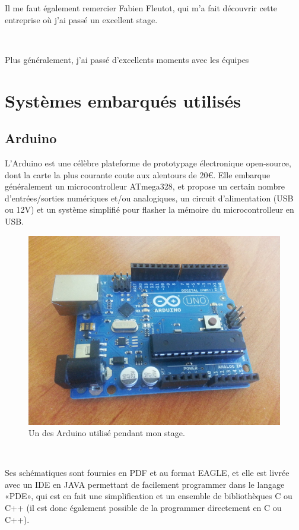\documentclass{article}
\begin{document}
Il me faut également remercier Fabien Fleutot, qui m’a fait découvrir cette entreprise où j’ai passé un excellent stage.

~

Plus généralement, j’ai passé d’excellents moments avec les équipes 

\clearpage

\appendix
\section{Systèmes embarqués utilisés}

\subsection{Arduino}
\label{arduino}

L’Arduino est une célèbre plateforme de prototypage électronique open-source, dont la carte la plus courante coute aux alentours de 20€.
Elle embarque généralement un microcontrolleur ATmega328, et propose un certain nombre d’entrées/sorties numériques et/ou analogiques, un circuit d’alimentation (USB ou 12V) et un système simplifié pour flasher la mémoire du microcontrolleur en USB.


\begin{figure}[h!]
    \centering\includegraphics[width=\linewidth/2]{img/arduino.jpg}
    \caption{Un des Arduino utilisé pendant mon stage.}
\end{figure}

~

Ses schématiques sont fournies en PDF et au format EAGLE, et elle est livrée avec un IDE en JAVA permettant de facilement programmer dans le langage «PDE», qui est en fait une simplification et un ensemble de bibliothèques C ou C++ (il est donc également possible de la programmer directement en C ou C++).
\end{document}
